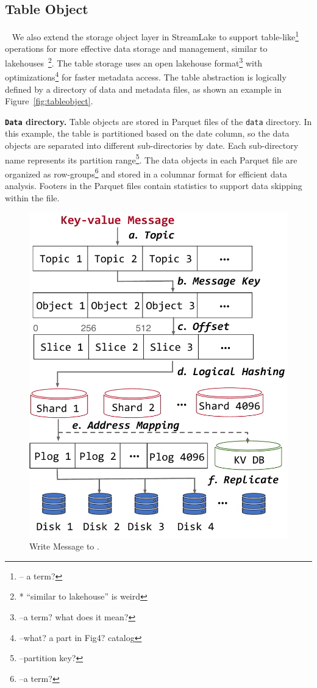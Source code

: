 \subsection{Table Object}~\label{subsec:tableobject}
We also extend the storage object layer in StreamLake to support table-like\footnote{-- a term?} operations for more effective data storage and management, similar to lakehouses~\cite{}\footnote{* ``similar to lakehouse'' is weird}. The table storage uses an open lakehouse format\footnote{--a term? what does it mean?} with optimizations\footnote{--what? a part in Fig4? catalog} for faster metadata access. The table abstraction is logically defined by a directory of data and metadata files, as shown an example  in Figure~\ref{fig:tableobject}.

\noindent \textbf{\texttt{Data} directory.} Table objects are stored in Parquet files of the \texttt{data} directory. In this example, the table is partitioned based on the date column, so the data objects are separated into different sub-directories by date. Each sub-directory name represents its partition range\footnote{--partition key?}. The data objects in each Parquet file are organized as row-groups\footnote{--a term?} and stored in a columnar format for efficient data analysis. Footers in the Parquet files contain statistics to support data skipping within the file.

\begin{figure}[htbp]

	\includegraphics[scale=0.3]{figures/write}
	\centering
	\vspace{-1em}
	\caption{Write Message to \sys.}
	\label{fig:write}
	\vspace{-1em}
\end{figure}


